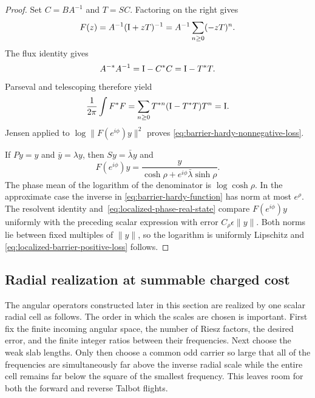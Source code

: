 \begin{proof}
Set $C=BA^{-1}$ and $T=SC$.  Factoring on the right gives
\begin{equation}
 F(z)=A^{-1}(\mathrm I+zT)^{-1}
 =A^{-1}\sum_{n\geq0}(-zT)^n.
\end{equation}
The flux identity gives
\begin{equation}
 A^{-*}A^{-1}=\mathrm I-C^*C=\mathrm I-T^*T.
\end{equation}
Parseval and telescoping therefore yield
\begin{equation}
 \frac1{2\pi}\int F^*F
 =\sum_{n\geq0}T^{*n}(\mathrm I-T^*T)T^n=\mathrm I.
\end{equation}
Jensen applied to $\log\|F(e^{i\phi})y\|^2$ proves
\eqref{eq:barrier-hardy-nonnegative-loss}.

If $Py=y$ and $\bar y=\lambda y$, then $Sy=\bar\lambda y$ and
\begin{equation}
 F(e^{i\phi})y
 =\frac{y}{\cosh\rho+
   e^{i\phi}\bar\lambda\sinh\rho}.
\end{equation}
The phase mean of the logarithm of the denominator is
$\log\cosh\rho$.  In the approximate case the inverse in
\eqref{eq:barrier-hardy-function} has norm at most $e^\rho$.
The resolvent identity and~\eqref{eq:localized-phase-real-state} compare
$F(e^{i\phi})y$ uniformly with the preceding scalar expression with error
$C_\rho\epsilon\|y\|$.  Both norms lie between fixed multiples of $\|y\|$,
so the logarithm is uniformly Lipschitz and
\eqref{eq:localized-barrier-positive-loss} follows.
\end{proof}

\subsection{Radial realization at summable charged cost}

The angular operators constructed later in this section are realized by one
scalar radial cell as follows.
The order in which the scales are chosen is important.  First fix the finite
incoming angular space, the number of Riesz factors, the desired error, and
the finite integer ratios between their frequencies.  Next choose the weak
slab lengths.  Only then choose a common odd carrier so large that all of the
frequencies are simultaneously far above the inverse radial scale while the
entire cell remains far below the square of the smallest frequency.  This
leaves room for both the forward and reverse Talbot flights.

